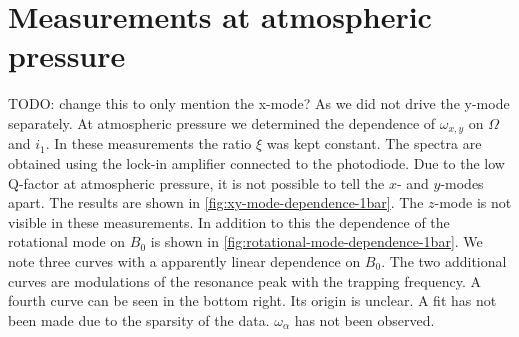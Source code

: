 \section{Measurements at atmospheric pressure}
\label{sec:measurements-at-atmospheric-pressure}
TODO: change this to only mention the x-mode? As we did not drive the y-mode separately.
At atmospheric pressure we determined the dependence of $\omega_{x,y}$ on $\Omega$ and $i_1$. In these measurements the ratio $\xi$ was kept constant. The spectra are obtained using the lock-in amplifier connected to the photodiode. Due to the low Q-factor at atmospheric pressure, it is not possible to tell the $x$- and $y$-modes apart. The results are shown in \autoref{fig:xy-mode-dependence-1bar}. The $z$-mode is not visible in these measurements. In addition to this the dependence of the rotational mode on $B_0$ is shown in \autoref{fig:rotational-mode-dependence-1bar}. We note three curves with a apparently linear dependence on $B_0$. The two additional curves are modulations of the resonance peak with the trapping frequency. A fourth curve can be seen in the bottom right. Its origin is unclear. A fit has not been made due to the sparsity of the data. $\omega_\alpha$ has not been observed.

